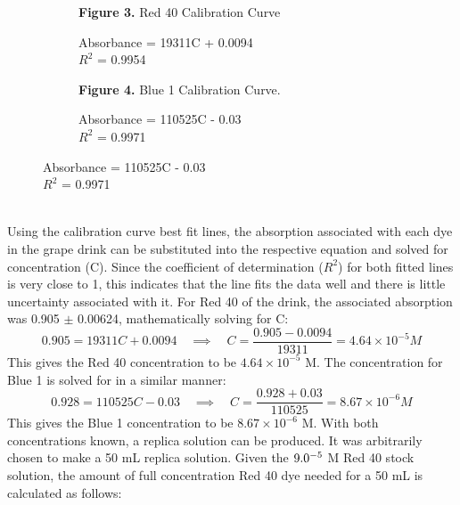 \documentclass[12pt]{article}
\begin{document}
\begin{tabular}{l r}
\end{tabular}
\begin{figure}[htb!]
  \begin{subfigure}[b]{0.5\textwidth}
  	\caption*{\textbf{Figure 3.} Red 40 Calibration Curve}
    	\resizebox{1\textwidth}{!}{}
    \caption*{Absorbance = 19311C + 0.0094 \\ $R^2$ = 0.9954}
  \end{subfigure}
  \hspace{0.25in}
  \begin{subfigure}[b]{0.5\textwidth}
  		\caption*{\textbf{Figure 4.} Blue 1 Calibration Curve.}
    	\resizebox{1\textwidth}{!}{}
    	\caption*{Absorbance = 110525C - 0.03\\$R^2$ = 0.9971}
  \end{subfigure}
\end{figure}\\
Using the calibration curve best fit lines, the absorption associated with each dye in the grape drink can be substituted into the respective equation and solved for concentration (C). Since the coefficient of determination ($R^2$) for both fitted lines is very close to 1, this indicates that the line fits the data well and there is little uncertainty associated with it.  For Red 40 of the drink, the associated absorption was 0.905 $\pm$ 0.00624, mathematically solving for C:
\begin{equation}
0.905 = 19311C + 0.0094 \hspace{12pt}\implies\hspace{12pt} C = \frac{0.905-0.0094}{19311} = 4.64 \times 10^{-5} M 
\end{equation}
This gives the Red 40 concentration to be $4.64 \times 10^{-5}$ M. The concentration for Blue 1 is solved for in a similar manner:
\begin{equation}
0.928 = 110525C - 0.03 \hspace{12pt}\implies\hspace{12pt} C = \frac{0.928+0.03}{110525} = 8.67 \times 10^{-6} M 
\end{equation} 
This gives the Blue 1 concentration to be $8.67 \times 10^{-6}$ M. With both concentrations known, a replica solution can be produced. It was arbitrarily chosen to make a 50 mL replica solution. Given the $9.0 \time 10^{-5}$ M Red 40 stock solution, the amount of full concentration Red 40 dye needed for a 50 mL is calculated as follows:
\end{document}
